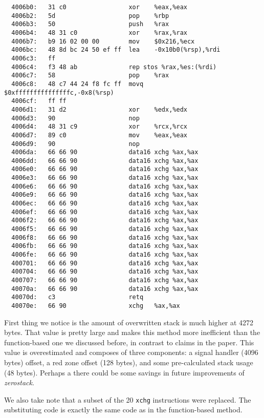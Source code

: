 \documentclass[a4paper,10pt,openright]{memoir}
\newcommand{\term}[1]{\textit{#1}}
\newcommand{\code}[1]{\texttt{#1}}
\begin{document}
\begin{verbatim}
  4006b0:   31 c0                 xor    %eax,%eax
  4006b2:   5d                    pop    %rbp
  4006b3:   50                    push   %rax
  4006b4:   48 31 c0              xor    %rax,%rax
  4006b7:   b9 16 02 00 00        mov    $0x216,%ecx
  4006bc:   48 8d bc 24 50 ef ff  lea    -0x10b0(%rsp),%rdi
  4006c3:   ff 
  4006c4:   f3 48 ab              rep stos %rax,%es:(%rdi)
  4006c7:   58                    pop    %rax
  4006c8:   48 c7 44 24 f8 fc ff  movq   $0xfffffffffffffffc,-0x8(%rsp)
  4006cf:   ff ff 
  4006d1:   31 d2                 xor    %edx,%edx
  4006d3:   90                    nop
  4006d4:   48 31 c9              xor    %rcx,%rcx
  4006d7:   89 c0                 mov    %eax,%eax
  4006d9:   90                    nop
  4006da:   66 66 90              data16 xchg %ax,%ax
  4006dd:   66 66 90              data16 xchg %ax,%ax
  4006e0:   66 66 90              data16 xchg %ax,%ax
  4006e3:   66 66 90              data16 xchg %ax,%ax
  4006e6:   66 66 90              data16 xchg %ax,%ax
  4006e9:   66 66 90              data16 xchg %ax,%ax
  4006ec:   66 66 90              data16 xchg %ax,%ax
  4006ef:   66 66 90              data16 xchg %ax,%ax
  4006f2:   66 66 90              data16 xchg %ax,%ax
  4006f5:   66 66 90              data16 xchg %ax,%ax
  4006f8:   66 66 90              data16 xchg %ax,%ax
  4006fb:   66 66 90              data16 xchg %ax,%ax
  4006fe:   66 66 90              data16 xchg %ax,%ax
  400701:   66 66 90              data16 xchg %ax,%ax
  400704:   66 66 90              data16 xchg %ax,%ax
  400707:   66 66 90              data16 xchg %ax,%ax
  40070a:   66 66 90              data16 xchg %ax,%ax
  40070d:   c3                    retq   
  40070e:   66 90                 xchg   %ax,%ax
\end{verbatim}

First thing we notice is the amount of overwritten stack is much higher 
at 4272 bytes. That value is pretty large and makes this method more 
inefficient than the function-based one we discussed before, in 
contrast to claims in the paper\cite{whatyouc}. This value is 
overestimated and composes of three components: a signal handler (4096 
bytes) offset, a red zone offset (128 bytes), and some pre-calculated 
stack usage (48 bytes). Perhaps a there could be some savings in future 
improvements of \term{zerostack}.

We also take note that a subset of the 20 \code{xchg} instructions were 
replaced. The substituting code is exactly the same code as in the 
function-based method.
\end{document}
